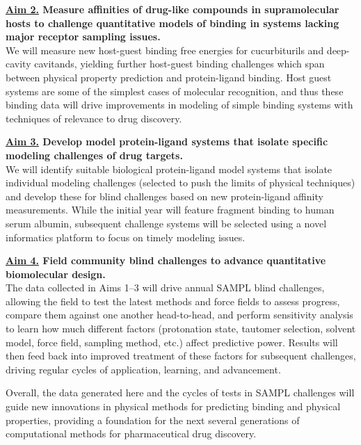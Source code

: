 \documentclass[11pt]{article}
\begin{document}
{\bf \underline{Aim 2.} Measure affinities of drug-like compounds in supramolecular hosts to challenge quantitative models of binding in systems lacking major receptor sampling issues.}\\
We will measure new host-guest binding free energies for cucurbiturils and deep-cavity cavitands, yielding further host-guest binding challenges which span between physical property prediction and protein-ligand binding. 
Host guest systems are some of the simplest cases of molecular recognition, and thus these binding data will drive improvements in modeling of simple binding systems with techniques of relevance to drug discovery.

{\bf \underline{Aim 3.} Develop model protein-ligand systems that isolate specific modeling challenges of drug targets.}\\
We will identify suitable biological protein-ligand model systems that isolate individual modeling challenges (selected to push the limits of physical techniques) and develop these for blind challenges based on new protein-ligand affinity measurements.
While the initial year will feature fragment binding to human serum albumin, subsequent challenge systems will be selected using a novel informatics platform to focus on timely modeling issues.

{\bf \underline{Aim 4.} Field community blind challenges to advance quantitative biomolecular design.} \\
The data collected in Aims 1--3 will drive annual SAMPL blind challenges, allowing the field to test the latest methods and force fields to assess progress, compare them against one another head-to-head, and perform sensitivity analysis to learn how much different factors (protonation state, tautomer selection, solvent model, force field, sampling method, etc.) affect predictive power. 
Results will then feed back into improved treatment of these factors for subsequent challenges, driving regular cycles of application, learning, and advancement.

Overall, the data generated here and the cycles of tests in SAMPL challenges will guide new innovations in physical methods for predicting binding and physical properties, providing a foundation for the next several generations of computational methods for pharmaceutical drug discovery. 
\end{document}
